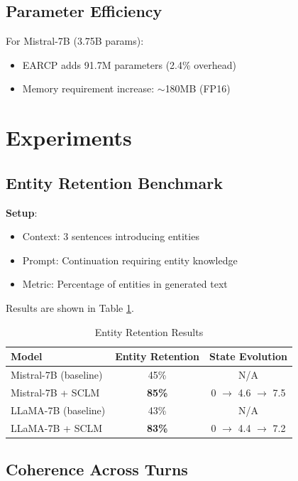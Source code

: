 \documentclass[11pt,a4paper]{article}
\begin{document}
\subsection{Parameter Efficiency}

For Mistral-7B (3.75B params):
\begin{itemize}
    \item EARCP adds 91.7M parameters (2.4\% overhead)
    \item Memory requirement increase: $\sim$180MB (FP16)
\end{itemize}

\section{Experiments}

\subsection{Entity Retention Benchmark}

\textbf{Setup}: 
\begin{itemize}
    \item Context: 3 sentences introducing entities
    \item Prompt: Continuation requiring entity knowledge
    \item Metric: Percentage of entities in generated text
\end{itemize}

Results are shown in Table \ref{tab:entity}.

\begin{table}[h]
\centering
\caption{Entity Retention Results}
\label{tab:entity}
\begin{tabular}{@{}lcc@{}}
\toprule
\textbf{Model} & \textbf{Entity Retention} & \textbf{State Evolution} \\
\midrule
Mistral-7B (baseline) & 45\% & N/A \\
Mistral-7B + SCLM & \textbf{85\%} & 0 $\rightarrow$ 4.6 $\rightarrow$ 7.5 \\
LLaMA-7B (baseline) & 43\% & N/A \\
LLaMA-7B + SCLM & \textbf{83\%} & 0 $\rightarrow$ 4.4 $\rightarrow$ 7.2 \\
\bottomrule
\end{tabular}
\end{table}

\subsection{Coherence Across Turns}
\end{document}
